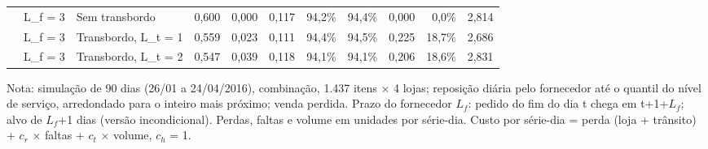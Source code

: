 \begin{table}[htbp]
{\begin{tabular}{lllrrrrrrrr}
 & L\_f = 3 & Sem transbordo & 0,600 & 0,000 & 0,117 & 94,2\% & 94,4\% & 0,000 & 0,0\% & 2,814 \\
 & L\_f = 3 & Transbordo, L\_t = 1 & 0,559 & 0,023 & 0,111 & 94,4\% & 94,5\% & 0,225 & 18,7\% & 2,686 \\
 & L\_f = 3 & Transbordo, L\_t = 2 & 0,547 & 0,039 & 0,118 & 94,1\% & 94,1\% & 0,206 & 18,6\% & 2,831 \\
\bottomrule
\end{tabular}
}
\par\smallskip
{\footnotesize Nota: simulação de 90 dias (26/01 a 24/04/2016), combinação, 1.437 itens × 4 lojas; reposição diária pelo fornecedor até o quantil do nível de serviço, arredondado para o inteiro mais próximo; venda perdida. Prazo do fornecedor $L_f$: pedido do fim do dia t chega em t+1+$L_f$; alvo de $L_f$+1 dias (versão incondicional). Perdas, faltas e volume em unidades por série-dia. Custo por série-dia = perda (loja + trânsito) + $c_r$ × faltas + $c_t$ × volume, $c_h$ = 1.}
\end{table}
